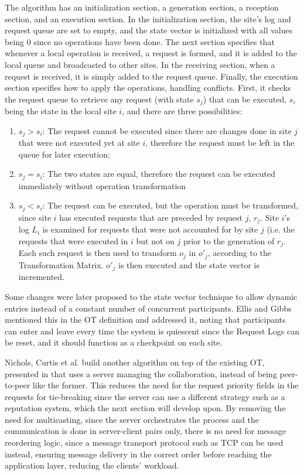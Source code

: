 The algorithm has an initialization section, a generation section, a reception section, and an execution section.
In the initialization section, the site's log and request queue are set to empty, and the state vector is initialized with all values being 0 since no operations have been done. The next section specifies that whenever a local operation is received, a request is formed, and it is added to the local queue and broadcasted to other sites. In the receiving section, when a request is received, it is simply added to the request queue. Finally, the execution section specifies how to apply the operations, handling conflicts. First, it checks the request queue to retrieve any request (with state $s_j$) that can be executed, $s_i$ being the state in the local site $i$, and there are three possibilities:

\begin{enumerate}
    \item $s_j > s_i$: The request cannot be executed since there are changes done in site $j$ that were not executed yet at site $i$, therefore the request must be left in the queue for later execution;
    \item $s_j = s_i$: The two states are equal, therefore the request can be executed immediately without operation transformation
    \item $s_j < s_i$: The request can be executed, but the operation must be transformed, since site $i$ has executed requests that are preceded by request $j$, $r_j$. Site $i$'s log $L_i$ is examined for requests that were not accounted for by site $j$ (i.e. the requests that were executed in $i$ but not on $j$ prior to the generation of $r_j$. Each such request is then used to transform $o_j$ in $o'_j$, according to the Transformation Matrix. $o'_j$ is then executed and the state vector is incremented.
\end{enumerate}

Some changes were later proposed to the state vector technique \cite{Landes2006} \cite{Almeida2008} to allow dynamic entries instead of a constant number of concurrent participants. Ellis and Gibbs \cite{Ellis1989} mentioned this in the OT definition and addressed it, noting that participants can enter and leave every time the system is quiescent since the Request Logs can be reset, and it should function as a checkpoint on each site.

Nichols, Curtis et al. \cite{Nichols1995} build another algorithm on top of the existing OT, presented in \cite{Ellis1989} that uses a server managing the collaboration, instead of being peer-to-peer like the former. This reduces the need for the request priority fields in the requests for tie-breaking since the server can use a different strategy such as a reputation system, which the next section will develop upon. By removing the need for multicasting, since the server orchestrates the process and the communication is done in server-client pairs only, there is no need for message reordering logic, since a message transport protocol such as TCP \cite{tcpprotocol} can be used instead, ensuring message delivery in the correct order before reaching the application layer, reducing the clients' workload.

